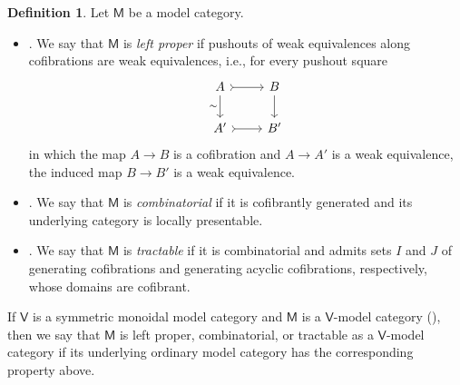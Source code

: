 \documentclass{amsart}
\newcommand{\cat}[1]{\mathsf{#1}}
\theoremstyle{definition}
\newtheorem{definition}[equation]{Definition}
\numberwithin{equation}{subsection}
\numberwithin{subsubsection}{subsection}
\begin{document}
\begin{definition}\label{def:adjectives.for.model.categories}
  Let \(\cat{M}\) be a model category.
  \begin{itemize}
    \item \textnormal{\cite[Definition~13.1.1]{Hir03}}.
      We say that \(\cat{M}\) is \emph{left proper} if pushouts of weak
      equivalences
      along cofibrations are weak equivalences, i.e., for every pushout square
      \[
        \begin{tikzcd}
          A \ar[r,rightarrowtail] \ar[d, "\sim"'] & B \ar[d] \\
          A' \ar[r,rightarrowtail] & B'
        \end{tikzcd}
      \]
      in which the map \(A\to B\) is a cofibration and \(A\to A'\) is a weak
      equivalence, the
      induced map \(B\to B'\) is a weak equivalence.

    \item \textnormal{\cite[Definition~A.2.6.1]{Lur17b}}.
      We say that \(\cat{M}\) is \emph{combinatorial} if it is cofibrantly
      generated
      and its underlying category is locally presentable.

    \item \textnormal{\cite[Definition~1.21]{Bar10}}.
      We say that \(\cat{M}\) is \emph{tractable} if it is combinatorial and
      admits
      sets \(I\) and \(J\) of generating cofibrations and generating acyclic
      cofibrations, respectively, whose domains are cofibrant.

  \end{itemize}

  If \(\cat{V}\) is a symmetric monoidal model category and \(\cat{M}\) is a
  \(\cat{V}\)-model category (), then we say that
  \(\cat{M}\) is left proper, combinatorial, or tractable as a \(\cat{V}\)-model
  category if its underlying ordinary model category has the corresponding
  property above.
\end{definition}
\end{document}
